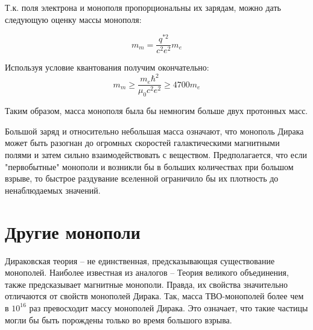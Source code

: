 \documentclass[a4paper, 12pt]{article}
\begin{document}
Т.к. поля электрона и монополя пропорциональны их зарядам, можно дать следующую оценку массы монополя:

\[
    m_m = \frac{q^{*2}}{c^2e^2}m_e  
\]

Используя условие квантования получим окончательно:
\[
    m_m \ge \frac{m_e \hbar^2}{\mu_0 c^2 e^2} \ge 4700m_e  
\]

Таким образом, масса монополя была бы немногим больше двух протонных масс. 

Большой заряд и относительно небольшая масса означают, что монополь Дирака может быть разогнан до огромных скоростей галактическими магнитными полями и затем сильно взаимодействовать с веществом. Предполагается, что если "первобытные" монополи и возникли бы в больших количествах при большом взрыве, то быстрое раздувание вселенной ограничило бы их плотность до ненаблюдаемых значений.


\section{Другие монополи}
Дираковская теория -- не единственная, предсказывающая существование монополей. Наиболее известная из аналогов -- Теория великого объединения, также предсказывает магнитные монополи. Правда, их свойства значительно отличаются от свойств монополей Дирака. Так, масса ТВО-монополей более чем в $10^{16}$ раз превосходит массу монополей Дирака. Это означает, что такие частицы могли бы быть порождены только во время большого взрыва.








\end{document}

